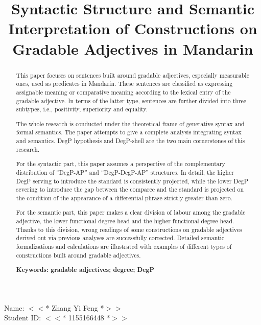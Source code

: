 \documentclass{ctexart}
\title{\LARGE{\bfseries{Syntactic Structure and Semantic Interpretation of Constructions on Gradable Adjectives in Mandarin}}}
\date{\vspace{-10ex}}
\begin{document}
\begin{center}
Name: $<<$* Zhang Yi Feng *$>>$ \\
Student ID: $<<$* 1155166448 *$>>$
\end{center}

\thispagestyle{empty} %

\newpage

\begin{abstract}
    \normalsize 
    {

    This paper focuses on sentences built around gradable adjectives, especially measurable ones, used as predicates in Mandarin. These sentences are classified as expressing assignable meaning or comparative meaning according to the lexical entry of the gradable adjective. In terms of the latter type, sentences are further divided into three subtypes, i.e., positivity, superiority and equality. 

    The whole research is conducted under the theoretical frame of generative syntax and formal semantics. The paper attempts to give a complete analysis integrating syntax and semantics. DegP hypothesis and DegP-shell are the two main cornerstones of this research.

    For the syntactic part, this paper assumes a perspective of the complementary distribution of ``DegP-AP'' and ``DegP-DegP-AP'' structures. In detail, the higher DegP serving to introduce the standard is consistently projected, while the lower DegP severing to introduce the gap between the comparee and the standard is projected on the condition of the appearance of a differential phrase strictly greater than zero. 

    For the semantic part, this paper makes a clear division of labour among the gradable adjective, the lower functional degree head and the higher functional degree head. Thanks to this division, wrong readings of some constructions on gradable adjectives derived out via previous analyses are successfully corrected. Detailed semantic formalizations and calculations are illustrated with examples of different types of constructions built around gradable adjectives. 

    
    \vspace{2ex}
    \bf{ Keywords: gradable adjectives; degree; DegP}
    }
    
\end{abstract}

\thispagestyle{empty} %
\end{document}
